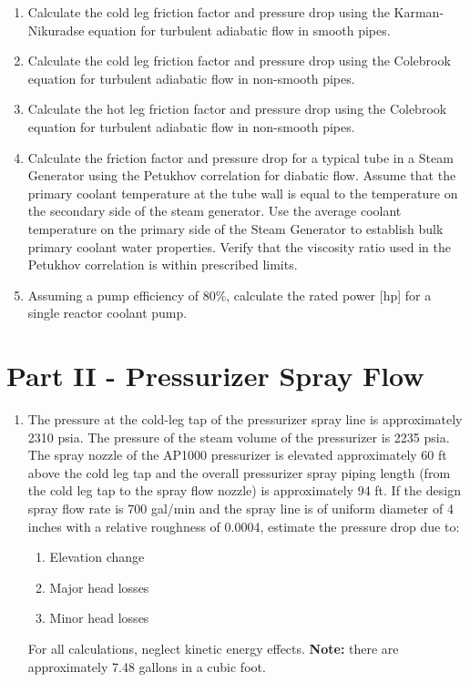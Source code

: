 \begin{fullwidth}
\begin{enumerate}
\item Calculate the cold leg friction factor and pressure drop using the Karman-Nikuradse equation for turbulent adiabatic flow in smooth pipes.

\vspace{1.0cm}

\item Calculate the cold leg friction factor and pressure drop using the Colebrook equation for turbulent adiabatic flow in non-smooth pipes.

\vspace{1.0cm}
\item Calculate the hot leg friction factor and pressure drop using the Colebrook equation for turbulent adiabatic flow in non-smooth pipes.

\vspace{1.0cm}

\item Calculate the friction factor and pressure drop for a typical tube in a Steam Generator using the Petukhov correlation for diabatic flow.  Assume that the primary coolant temperature at the tube wall is equal to the temperature on the secondary side of the steam generator.  Use the average coolant temperature on the primary side of the Steam Generator to establish bulk primary coolant water properties.  Verify that the viscosity ratio used in the Petukhov correlation is within prescribed limits.

\vspace{1.0 cm}

\item Assuming a pump efficiency of 80\%, calculate the rated power [hp] for a single reactor coolant pump.


\end{enumerate}

\section{Part II - Pressurizer Spray Flow}

\begin{enumerate}[resume]
\item The pressure at the cold-leg tap of the pressurizer spray line is approximately 2310 psia.  The pressure of the steam volume of the pressurizer is 2235 psia.  The spray nozzle of the AP1000 pressurizer is elevated approximately 60 ft above the cold leg tap and the overall pressurizer spray piping length (from the cold leg tap to the spray flow nozzle) is approximately 94 ft.  If the design spray flow rate is 700 gal/min and the spray line is of uniform diameter of 4 inches with a relative roughness of 0.0004, estimate the pressure drop due to:
\begin{enumerate}
\item Elevation change
\item Major head losses
\item Minor head losses
\end{enumerate}
For all calculations, neglect kinetic energy effects.  \textbf{Note:} there are approximately 7.48 gallons in a cubic foot.


\end{enumerate}
\end{fullwidth}
